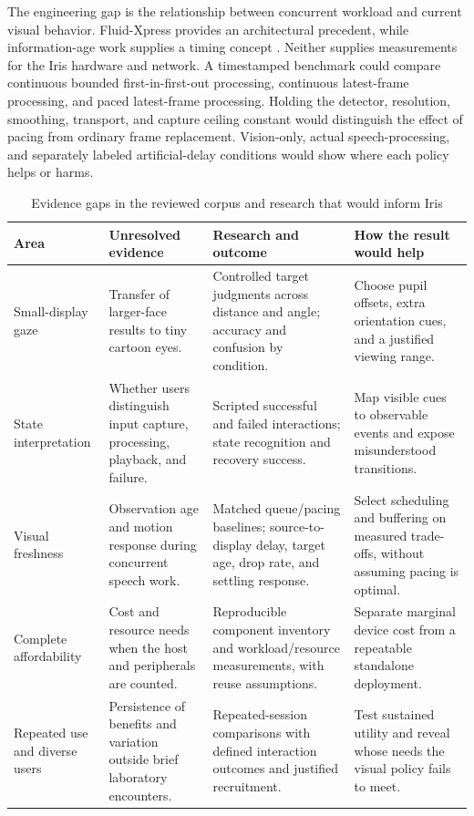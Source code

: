 \documentclass[journal]{IEEEtran}
\begin{document}
The engineering gap is the relationship between concurrent workload and current visual behavior. Fluid-Xpress provides an architectural precedent, while information-age work supplies a timing concept \cite{kang2026,yates2021,sun2017}. Neither supplies measurements for the Iris hardware and network. A timestamped benchmark could compare continuous bounded first-in-first-out processing, continuous latest-frame processing, and paced latest-frame processing. Holding the detector, resolution, smoothing, transport, and capture ceiling constant would distinguish the effect of pacing from ordinary frame replacement. Vision-only, actual speech-processing, and separately labeled artificial-delay conditions would show where each policy helps or harms.

\begin{table}[t]
\caption{Evidence gaps in the reviewed corpus and research that would inform Iris}
\label{tab:gaps}
\centering
\footnotesize
\setlength{\tabcolsep}{5pt}
\renewcommand{\arraystretch}{1.15}
\begin{tabularx}{\textwidth}{@{}p{}Y Y Y@{}}
\toprule
Area & Unresolved evidence & Research and outcome & How the result would help \\
\midrule
Small-display gaze & Transfer of larger-face results to tiny cartoon eyes. & Controlled target judgments across distance and angle; accuracy and confusion by condition. & Choose pupil offsets, extra orientation cues, and a justified viewing range. \\
State interpretation & Whether users distinguish input capture, processing, playback, and failure. & Scripted successful and failed interactions; state recognition and recovery success. & Map visible cues to observable events and expose misunderstood transitions. \\
Visual freshness & Observation age and motion response during concurrent speech work. & Matched queue/pacing baselines; source-to-display delay, target age, drop rate, and settling response. & Select scheduling and buffering on measured trade-offs, without assuming pacing is optimal. \\
Complete affordability & Cost and resource needs when the host and peripherals are counted. & Reproducible component inventory and workload/resource measurements, with reuse assumptions. & Separate marginal device cost from a repeatable standalone deployment. \\
Repeated use and diverse users & Persistence of benefits and variation outside brief laboratory encounters. & Repeated-session comparisons with defined interaction outcomes and justified recruitment. & Test sustained utility and reveal whose needs the visual policy fails to meet. \\
\bottomrule
\end{tabularx}
\end{table}
\end{document}
